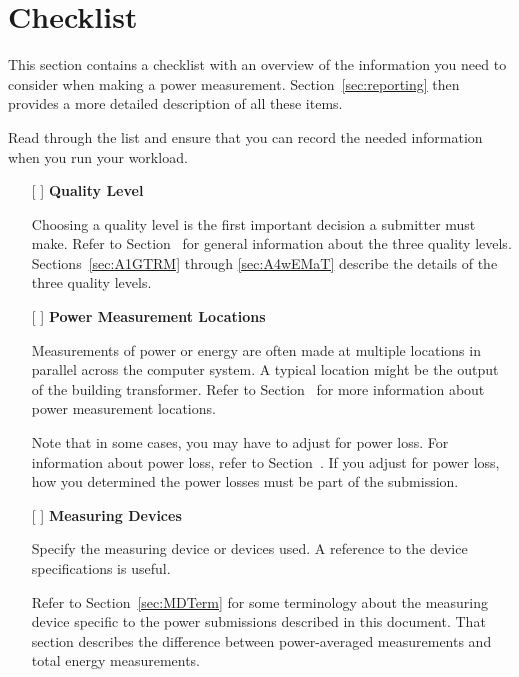 \chapter{Checklist}
\label{sec:checklist}

\noindent
This section contains a checklist with an overview of the information you need to consider when making a power measurement.
Section~\ref{sec:reporting} then provides a more detailed description of all these items.
\wl

\noindent
Read through the list and ensure that you can record the needed 
information when you run your workload.
\wl

\begin{itemize}
\item[{[ ]}]
\textbf{Quality Level}

Choosing a quality level is the first important decision a submitter must make.
Refer to Section~ for general information about the three quality levels.
Sections~\ref{sec:A1GTRM} through \ref{sec:A4wEMaT} describe the details of the three quality levels.

\item[{[ ]}]
\textbf{Power Measurement Locations}

Measurements of power or energy are often made at multiple locations in parallel across the computer system.
A typical location might be the output of the building transformer.
Refer to Section~ for more information about power measurement locations.

Note that in some cases, you may have to adjust for power loss.
For information about power loss, refer to Section~.
If you adjust for power loss, how you determined the power losses must be part of the submission.


\item[{[ ]}]
\textbf{Measuring Devices}

Specify the measuring device or devices used.
A reference to the device specifications is useful.

Refer to Section~\ref{sec:MDTerm} for some terminology about the measuring device specific to the power submissions described in this document.
That section describes the difference between power-averaged measurements and total energy measurements.


\end{itemize}
